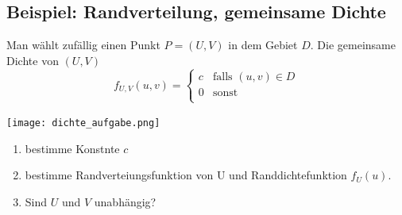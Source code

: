 \subsection*{Beispiel: Randverteilung, gemeinsame Dichte}
Man wählt zufällig einen Punkt $P = (U, V)$ in dem Gebiet $D$. Die gemeinsame Dichte von $(U, V)$
\[
  f_{U, V} (u, v) =
  \begin{cases}
    c & \text{falls } (u, v) \in D \\
    0 & \text{sonst}               \\
  \end{cases}
\]
\begin{center}
  \texttt{[image: dichte\_aufgabe.png]}
\end{center}
\begin{enumerate}[noitemsep,topsep=0pt,parsep=0pt,partopsep=0pt]  
  \item bestimme Konstnte $c$
  \item bestimme Randverteiungsfunktion von U und Randdichtefunktion $f_U(u)$.
  \item Sind $U$ und $V$ unabhängig?
\end{enumerate}

